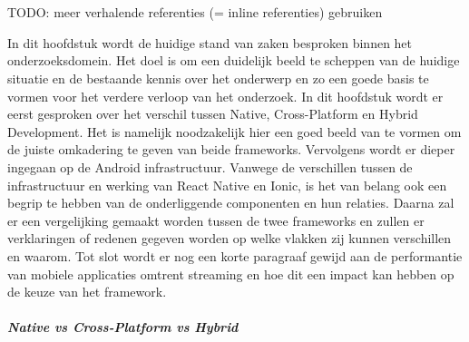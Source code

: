 \chapter{}%
\label{ch:stand-van-zaken}



TODO: meer verhalende referenties (= inline referenties) gebruiken

In dit hoofdstuk wordt de huidige stand van zaken besproken binnen het onderzoeksdomein. Het doel is om een duidelijk beeld te scheppen van de huidige situatie en de bestaande kennis over het onderwerp en zo een goede basis te vormen voor het verdere verloop van het onderzoek. In dit hoofdstuk wordt er eerst gesproken over het verschil tussen Native, Cross-Platform en Hybrid Development. Het is namelijk noodzakelijk hier een goed beeld van te vormen om de juiste omkadering te geven van beide frameworks. Vervolgens wordt er dieper ingegaan op de Android infrastructuur. Vanwege de verschillen tussen de infrastructuur en werking van React Native en Ionic, is het van belang ook een begrip te hebben van de onderliggende componenten en hun relaties. Daarna zal er een vergelijking gemaakt worden tussen de twee frameworks en zullen er verklaringen of redenen gegeven worden op welke vlakken zij kunnen verschillen en waarom. Tot slot wordt er nog een korte paragraaf gewijd aan de performantie van mobiele applicaties omtrent streaming en hoe dit een impact kan hebben op de keuze van het framework.

\paragraph{Native vs Cross-Platform vs Hybrid}

